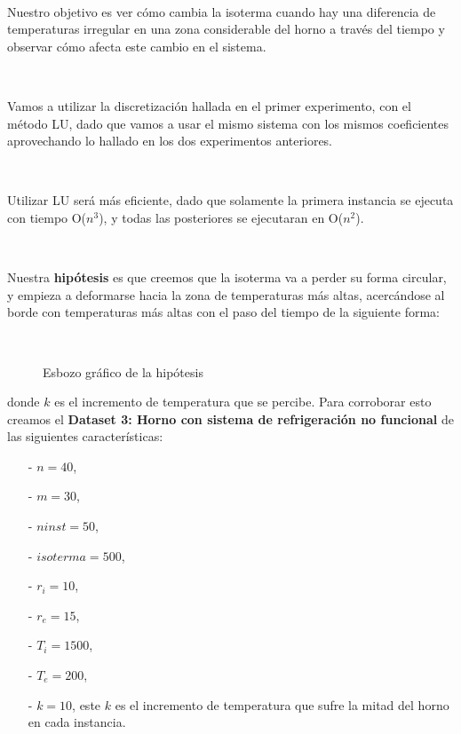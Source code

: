 \

Nuestro objetivo es ver cómo cambia la isoterma cuando hay una diferencia de temperaturas irregular en una zona considerable del horno a través del tiempo y observar cómo afecta este cambio en el sistema.

\

Vamos a utilizar la discretización hallada en el primer experimento, con el método LU, dado que vamos a usar el mismo sistema con los mismos coeficientes aprovechando lo hallado en los dos experimentos anteriores.

\

Utilizar LU será más eficiente, dado que solamente la primera instancia se ejecuta con tiempo O($n^3$), y todas las posteriores se ejecutaran en O($n^2$).

\

Nuestra \textbf{hipótesis} es que creemos que la isoterma va a perder su forma circular, y empieza a deformarse hacia la zona de temperaturas más altas, acercándose al borde con temperaturas más altas con el paso del tiempo de la siguiente forma:

\

\begin{figure}[h]
    \begin{center}
    \caption{Esbozo gráfico de la hipótesis}
    \label{fig:hipotesis}
    \end{center}
\end{figure}

donde $k$ es el incremento de temperatura que se percibe. Para corroborar esto creamos el \textbf{Dataset 3: Horno con sistema de refrigeración no funcional} de las siguientes características:

\begin{itemize}
    \item[-] $n = 40$,
    \item[-] $m = 30$,
    \item[-] $ninst = 50$,
    \item[-] $isoterma = 500$,
    \item[-] $r_i = 10$,
    \item[-] $r_e = 15$,
    \item[-] $T_i = 1500$,
    \item[-] $T_e = 200$,
    \item[-] $k = 10$, este $k$ es el incremento de temperatura que sufre la mitad del horno en cada instancia.
\end{itemize}


